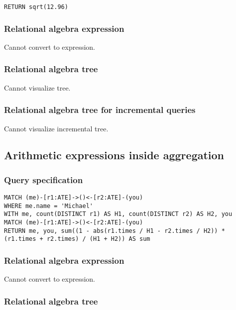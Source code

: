 \begin{lstlisting}
RETURN sqrt(12.96)
\end{lstlisting}

\subsubsection*{Relational algebra expression}

Cannot convert to expression.

\subsubsection*{Relational algebra tree}

Cannot visualize tree.

\subsubsection*{Relational algebra tree for incremental queries}

Cannot visualize incremental tree.

\subsection{Arithmetic expressions inside aggregation}

\subsubsection*{Query specification}

\begin{lstlisting}
MATCH (me)-[r1:ATE]->()<-[r2:ATE]-(you)
WHERE me.name = 'Michael'
WITH me, count(DISTINCT r1) AS H1, count(DISTINCT r2) AS H2, you
MATCH (me)-[r1:ATE]->()<-[r2:ATE]-(you)
RETURN me, you, sum((1 - abs(r1.times / H1 - r2.times / H2)) * (r1.times + r2.times) / (H1 + H2)) AS sum
\end{lstlisting}

\subsubsection*{Relational algebra expression}

Cannot convert to expression.

\subsubsection*{Relational algebra tree}

